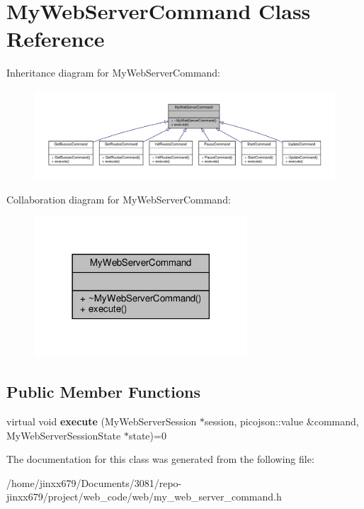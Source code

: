 \hypertarget{classMyWebServerCommand}{}\section{My\+Web\+Server\+Command Class Reference}
\label{classMyWebServerCommand}


Inheritance diagram for My\+Web\+Server\+Command\+:
\nopagebreak
\begin{figure}[H]
\begin{center}
\leavevmode
\includegraphics[width=350pt]{classMyWebServerCommand__inherit__graph}
\end{center}
\end{figure}


Collaboration diagram for My\+Web\+Server\+Command\+:\nopagebreak
\begin{figure}[H]
\begin{center}
\leavevmode
\includegraphics[width=225pt]{classMyWebServerCommand__coll__graph}
\end{center}
\end{figure}
\subsection*{Public Member Functions}
\begin{DoxyCompactItemize}
\item 
\mbox{\label{classMyWebServerCommand_a56147a0fa8429087006bfdf120069616}} 
virtual void {\bfseries execute} (My\+Web\+Server\+Session $\ast$session, picojson\+::value \&command, My\+Web\+Server\+Session\+State $\ast$state)=0
\end{DoxyCompactItemize}


The documentation for this class was generated from the following file\+:\begin{DoxyCompactItemize}
\item 
/home/jinxx679/\+Documents/3081/repo-\/jinxx679/project/web\+\_\+code/web/my\+\_\+web\+\_\+server\+\_\+command.\+h\end{DoxyCompactItemize}
